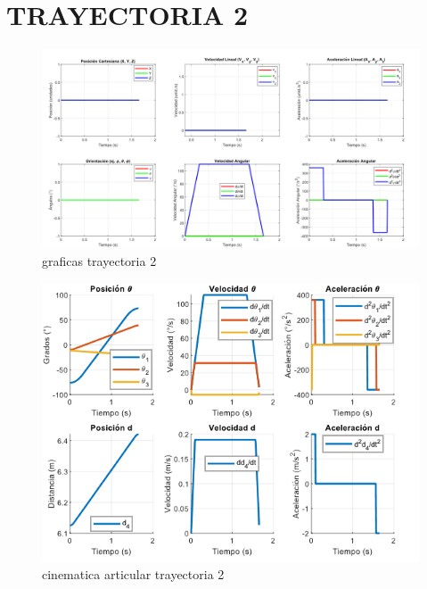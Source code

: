 
\section{TRAYECTORIA 2}
\begin{figure}[h]
	\centering
	\includegraphics[width=0.9\linewidth]{"../cinematica inversa/img/graficas_taryectoria 2"}
	\caption{graficas trayectoria 2}
	\label{fig:graficastaryectoria-2}
\end{figure}

\newpage

\begin{figure} [h]
	\centering
	\includegraphics[width=0.9\linewidth]{"../cinematica inversa/img/cinematica articular_trayectoria2"}
	\caption{cinematica articular trayectoria 2}
	\label{fig:cinematica-articulartrayectoria2}
\end{figure}

\newpage

